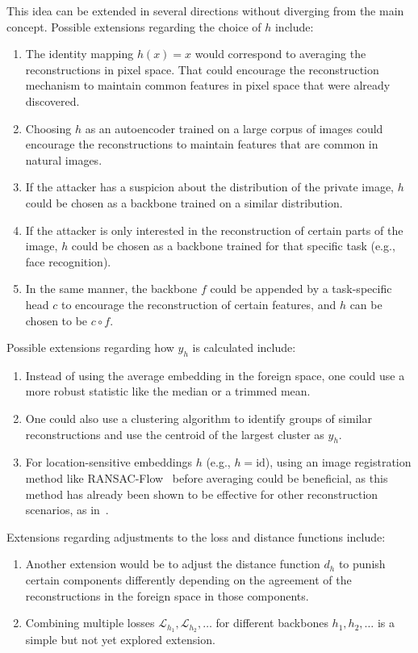 \documentclass[10pt,twocolumn]{article}
\begin{document}
This idea can be extended in several directions without diverging from the main concept.
Possible extensions regarding the choice of $h$ include:
\begin{enumerate}
    \item The identity mapping $h(x) = x$ would correspond to averaging the reconstructions in pixel space.
    That could encourage the reconstruction mechanism to maintain common features in pixel space that were already discovered.
    \item Choosing $h$ as an autoencoder trained on a large corpus of images could encourage the reconstructions to maintain features that are common in natural images.
    \item If the attacker has a suspicion about the distribution of the private image, $h$ could be chosen as a backbone trained on a similar distribution.
    \item If the attacker is only interested in the reconstruction of certain parts of the image, $h$ could be chosen as a backbone trained for that specific task (e.g., face recognition).
    \item In the same manner, the backbone $f$ could be appended by a task-specific head $c$ to encourage the reconstruction of certain features, and $h$ can be chosen to be $c \circ f$.
\end{enumerate}
Possible extensions regarding how $y_h$ is calculated include:
\begin{enumerate}
    \item Instead of using the average embedding in the foreign space, one could use a more robust statistic like the median or a trimmed mean.
    \item One could also use a clustering algorithm to identify groups of similar reconstructions and use the centroid of the largest cluster as $y_h$.
    \item For location-sensitive embeddings $h$ (e.g., $h=\text{id}$), using an image registration method like RANSAC-Flow~\cite{shenRANSACFlowGenericTwoStage2020} before averaging could be beneficial, as this method has already been shown to be effective for other reconstruction scenarios, as in~\cite{yinSeeGradientsImage2021}.
\end{enumerate}
Extensions regarding adjustments to the loss and distance functions include:
\begin{enumerate}
    \item Another extension would be to adjust the distance function $d_h$ to punish certain components differently depending on the agreement of the reconstructions in the foreign space in those components.
    \item Combining multiple losses $\mathcal{L}_{h_1}, \mathcal{L}_{h_2}, \dots$ for different backbones $h_1, h_2, \dots$ is a simple but not yet explored extension.
\end{enumerate}
\end{document}
